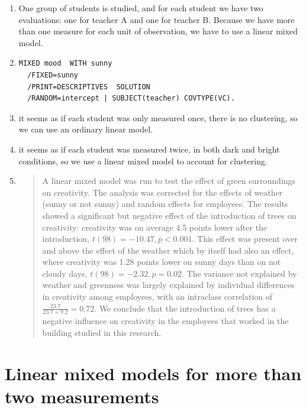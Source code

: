 \documentclass[]{report}\usepackage[]{graphicx}\usepackage[]{color}
\begin{document}
\begin{enumerate}
\item  One group of students is studied, and for each student we have two evaluations: one for teacher A and one for teacher B. Because we have more than one measure for each unit of observation, we have to use a linear mixed model. 

\item 

\begin{verbatim}
MIXED mood  WITH sunny
  /FIXED=sunny
  /PRINT=DESCRIPTIVES  SOLUTION
  /RANDOM=intercept | SUBJECT(teacher) COVTYPE(VC).
\end{verbatim}

\item  it seems as if each student was only measured once, there is no clustering, so we can use an ordinary linear model.

\item  it seems as if each student was measured twice, in both dark and bright conditions, so we use a linear mixed model to account for clustering.

\item  
\begin{quotation}

A linear mixed model was run to test the effect of green surroundings on creativity. The analysis was corrected for the effects of weather (sunny or not sunny) and random effects for employees. The results showed a significant but negative effect of the introduction of trees on creativity: creativity was on average 4.5 points lower after the introduction, $t(98)=-10.47, p < 0.001$. This effect was present over and above the effect of the weather which by itself had also an effect, where creativity was 1.28 points lower on sunny days than on not cloudy days, $t(98)=-2.32, p=0.02$. The variance not explained by weather and greenness was largely explained by individual differences in creativity among employees, with an intraclass correlation of $\frac{23.7}{23.7+9.2}= 0.72$. We conclude that the introduction of trees has a negative influence on creativity in the employees that worked in the building studied in this research. 

\end{quotation}

\end{enumerate}



\chapter{Linear mixed models for more than two measurements}\label{chap:premidpost}
\end{document}
